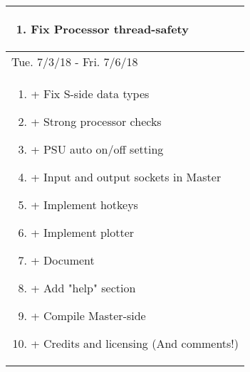 \documentclass{article}
\begin{document}
\begin{center}
\begin{longtable}{| p{} |}
\begin{enumerate}
	\item Fix Processor thread-safety
\end{enumerate}\\
\hline
\multicolumn{1}{|l|}{Tue. 7/3/18 - Fri. 7/6/18}\\*
\hline
\begin{enumerate}
	\item + Fix S-side data types
	\item + Strong processor checks
	\item + PSU auto on/off setting
	\item + Input and output sockets in Master
	\item + Implement hotkeys
	\item + Implement plotter
	\item + Document
	\item + Add "help" section
	\item + Compile Master-side
	\item + Credits and licensing (And comments!)
\end{enumerate}\\

\hline
\end{longtable}
\end{center}
\end{document}
